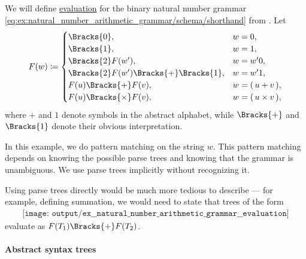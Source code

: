 \begin{example}\label{ex:natural_number_arithmetic_grammar/evaluation}
  We will define \hyperref[con:evaluation]{evaluation} for the binary natural number grammar \eqref{eq:ex:natural_number_arithmetic_grammar/schema/shorthand} from . Let
  \begin{equation*}
    F(w) \coloneqq \begin{cases}
      \Bracks{0},                             &w = 0, \\
      \Bracks{1},                             &w = 1, \\
      \Bracks{2} F(w'),                       &w = w' 0, \\
      \Bracks{2} F(w') \Bracks{+} \Bracks{1}, &w = w' 1, \\
      F(u) \Bracks{+} F(v),                   &w = \mathtt{(} \thinspace u + v \thinspace \mathtt{)}, \\
      F(u) \Bracks{\times} F(v),              &w = \mathtt{(} \thinspace u \times v \thinspace \mathtt{)},
    \end{cases}
  \end{equation*}
  where \( + \) and \( 1 \) denote symbols in the abstract alphabet, while \( \Bracks{+} \) and \( \Bracks{1} \) denote their obvious interpretation.

  In this example, we do pattern matching on the string \( w \). This pattern matching depends on knowing the possible parse trees and knowing that the grammar is unambiguous. We use parse trees implicitly without recognizing it.

  Using parse trees directly would be much more tedious to describe --- for example, defining summation, we would need to state that trees of the form
  \begin{equation*}
    \begin{aligned}
      \texttt{[image: output/ex\_\_natural\_number\_arithmetic\_grammar\_\_evaluation]}
    \end{aligned}
  \end{equation*}
  evaluate as \( F(T_1) \Bracks{+} F(T_2) \).
\end{example}

\paragraph{Abstract syntax trees}

